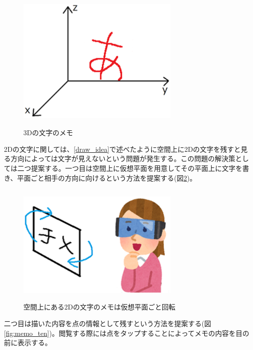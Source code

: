 \documentclass[11pt,a4j, titlepage]{jarticle} %
\begin{document}
\begin{figure}[H]
  \begin{center}
    \includegraphics[clip,height=7.0cm,width=8.0cm]{./3d_moji.eps}
    \caption{3Dの文字のメモ}
    \label{fig:3d_moji}
  \end{center}
\end{figure}

2Dの文字に関しては、\ref{draw_idea}で述べたように空間上に2Dの文字を残すと見る方向によっては文字が見えないという問題が発生する。この問題の解決策としては二つ提案する。一つ目は空間上に仮想平面を用意してその平面上に文字を書き、平面ごと相手の方向に向けるという方法を提案する(図\ref{fig:memo_kaiten})。

\begin{figure}[H]
  \begin{center}
    \includegraphics[clip,height=6.0cm,width=8.0cm]{./memo_kaiten.eps}
    \caption{空間上にある2Dの文字のメモは仮想平面ごと回転}
    \label{fig:memo_kaiten}
  \end{center}
\end{figure}

二つ目は描いた内容を点の情報として残すという方法を提案する(図\ref{fig:memo_ten})。閲覧する際には点をタップすることによってメモの内容を目の前に表示する。
\end{document}
